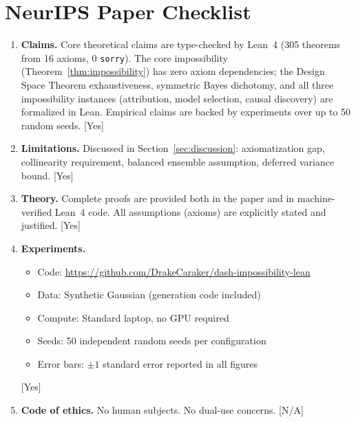 \documentclass{article}
\begin{document}



\newpage
\section*{NeurIPS Paper Checklist}

\begin{enumerate}
\item \textbf{Claims.} Core theoretical claims are type-checked by Lean~4 (305 theorems from 16 axioms, 0 \texttt{sorry}). The core impossibility (Theorem~\ref{thm:impossibility}) has zero axiom dependencies; the Design Space Theorem exhaustiveness, symmetric Bayes dichotomy, and all three impossibility instances (attribution, model selection, causal discovery) are formalized in Lean. Empirical claims are backed by experiments over up to 50 random seeds. [Yes]

\item \textbf{Limitations.} Discussed in Section~\ref{sec:discussion}: axiomatization gap, collinearity requirement, balanced ensemble assumption, deferred variance bound. [Yes]

\item \textbf{Theory.} Complete proofs are provided both in the paper and in machine-verified Lean~4 code. All assumptions (axioms) are explicitly stated and justified. [Yes]

\item \textbf{Experiments.}
  \begin{itemize}
    \item Code: \url{https://github.com/DrakeCaraker/dash-impossibility-lean}
    \item Data: Synthetic Gaussian (generation code included)
    \item Compute: Standard laptop, no GPU required
    \item Seeds: 50 independent random seeds per configuration
    \item Error bars: $\pm 1$ standard error reported in all figures
  \end{itemize}
  [Yes]

\item \textbf{Code of ethics.} No human subjects. No dual-use concerns. [N/A]
\end{enumerate}
\end{document}
